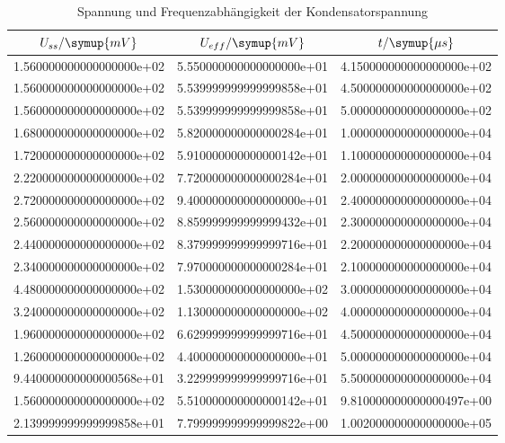     \begin{table}
      \centering
      \caption{Spannung und Frequenzabhängigkeit der Kondensatorspannung}
      \label{tab:5ctab}
    \begin{tabular}{S S S}
      \toprule
      $U_{ss}/\symup{mV}$ & $U_{eff}/\symup{mV}$ & $t/\symup{\mu s}$ \\
      \midrule
      1.560000000000000000e+02 & 5.550000000000000000e+01 & 4.150000000000000000e+02\\
      1.560000000000000000e+02 & 5.539999999999999858e+01 & 4.500000000000000000e+02\\
      1.560000000000000000e+02 & 5.539999999999999858e+01 & 5.000000000000000000e+02\\
      1.680000000000000000e+02 & 5.820000000000000284e+01 & 1.000000000000000000e+04\\
      1.720000000000000000e+02 & 5.910000000000000142e+01 & 1.100000000000000000e+04\\
      2.220000000000000000e+02 & 7.720000000000000284e+01 & 2.000000000000000000e+04\\
      2.720000000000000000e+02 & 9.400000000000000000e+01 & 2.400000000000000000e+04\\
      2.560000000000000000e+02 & 8.859999999999999432e+01 & 2.300000000000000000e+04\\
      2.440000000000000000e+02 & 8.379999999999999716e+01 & 2.200000000000000000e+04\\
      2.340000000000000000e+02 & 7.970000000000000284e+01 & 2.100000000000000000e+04\\
      4.480000000000000000e+02 & 1.530000000000000000e+02 & 3.000000000000000000e+04\\
      3.240000000000000000e+02 & 1.130000000000000000e+02 & 4.000000000000000000e+04\\
      1.960000000000000000e+02 & 6.629999999999999716e+01 & 4.500000000000000000e+04\\
      1.260000000000000000e+02 & 4.400000000000000000e+01 & 5.000000000000000000e+04\\
      9.440000000000000568e+01 & 3.229999999999999716e+01 & 5.500000000000000000e+04\\
      1.560000000000000000e+02 & 5.510000000000000142e+01 & 9.810000000000000497e+00\\
      2.139999999999999858e+01 & 7.799999999999999822e+00 & 1.002000000000000000e+05\\
      \bottomrule
    \end{tabular}
    \end{table}
    \FloatBarrier
